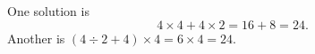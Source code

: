 One solution is
\[
4\times4+4\times2=16+8=\boxed{24}.
\]
Another is $\left(4\div2+4\right)\times4=6\times4=24$.
